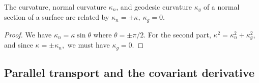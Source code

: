 \begin{cor}
    The curvature, normal curvature $\kappa_n $, and geodesic curvature $\kappa_g$ of a normal section of a surface are related by $\kappa_n =\pm \kappa,\ \kappa_g=0$.
\end{cor}
\begin{proof}
    We have $\kappa_n =\kappa\sin \theta$ where $\theta=\pm\pi /2$. For the second part, $\kappa^2=\kappa_n ^2+\kappa_g^2$, and since $\kappa=\pm \kappa_n ,$ we must have $\kappa_g=0$.
\end{proof}

\subsection{Parallel transport and the covariant derivative}

